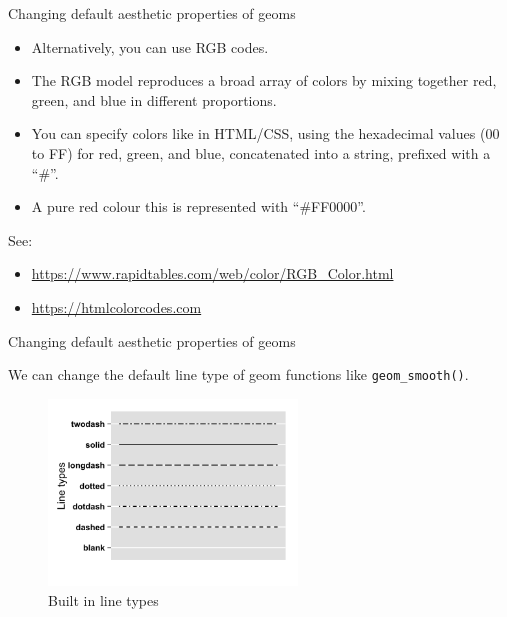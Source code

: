 \documentclass[ignorenonframetext,]{beamer}
\providecommand{\tightlist}{%
  \setlength{\itemsep}{0pt}\setlength{\parskip}{0pt}}
\begin{document}
\begin{frame}{Changing default aesthetic properties of geoms}
\protect\hypertarget{changing-default-aesthetic-properties-of-geoms-17}{}

\begin{itemize}
\item
  Alternatively, you can use RGB codes.
\item
  The RGB model reproduces a broad array of colors by mixing together
  red, green, and blue in different proportions.
\item
  You can specify colors like in HTML/CSS, using the hexadecimal values
  (00 to FF) for red, green, and blue, concatenated into a string,
  prefixed with a ``\#''.
\item
  A pure red colour this is represented with ``\#FF0000''.
\end{itemize}

See:

\begin{itemize}
\tightlist
\item
  \url{https://www.rapidtables.com/web/color/RGB_Color.html}
\item
  \url{https://htmlcolorcodes.com}
\end{itemize}

\end{frame}

\begin{frame}[fragile]{Changing default aesthetic properties of geoms}
\protect\hypertarget{changing-default-aesthetic-properties-of-geoms-18}{}

We can change the default line type of geom functions like
\texttt{geom\_smooth()}.

\begin{figure}
\centering
\includegraphics[width=2.60417in,height=\textheight]{lty.png}
\caption{Built in line types}
\end{figure}

\end{frame}
\end{document}
